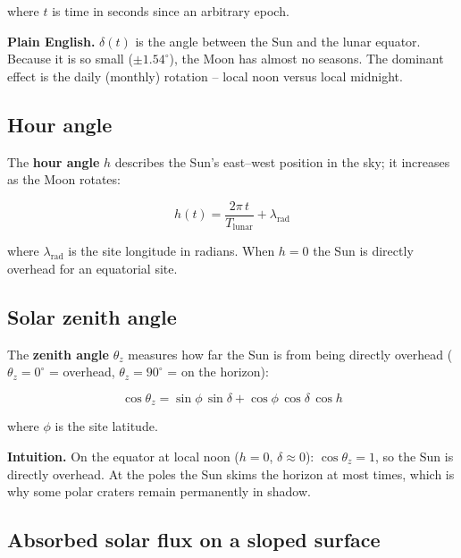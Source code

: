 \documentclass[12pt, a4paper]{article}
\begin{document}
where $t$ is time in seconds since an arbitrary epoch.

\begin{plainbox}
  \textbf{Plain English.}
  $\delta(t)$ is the angle between the Sun and the lunar equator.
  Because it is so small ($\pm 1.54^{\circ}$), the Moon has almost
  no seasons.
  The dominant effect is the daily (monthly) rotation -- local noon
  versus local midnight.
\end{plainbox}

\subsection{Hour angle}

The \textbf{hour angle} $h$ describes the Sun's east--west position
in the sky; it increases as the Moon rotates:

\begin{equation}
  h(t) = \frac{2\pi\,t}{T_{\text{lunar}}} + \lambda_{\text{rad}}
  \label{eq:hour_angle}
\end{equation}

where $\lambda_{\text{rad}}$ is the site longitude in radians.
When $h = 0$ the Sun is directly overhead for an equatorial site.

\subsection{Solar zenith angle}

The \textbf{zenith angle} $\theta_z$ measures how far the Sun is
from being directly overhead ($\theta_z = 0^{\circ}$ = overhead,
$\theta_z = 90^{\circ}$ = on the horizon):

\begin{equation}
  \cos\theta_z
  = \sin\phi\,\sin\delta + \cos\phi\,\cos\delta\,\cos h
  \label{eq:zenith}
\end{equation}

where $\phi$ is the site latitude.

\begin{plainbox}
  \textbf{Intuition.}
  On the equator at local noon ($h=0$, $\delta\approx0$):
  $\cos\theta_z = 1$, so the Sun is directly overhead.
  At the poles the Sun skims the horizon at most times, which is
  why some polar craters remain permanently in shadow.
\end{plainbox}

\subsection{Absorbed solar flux on a sloped surface}
\end{document}
